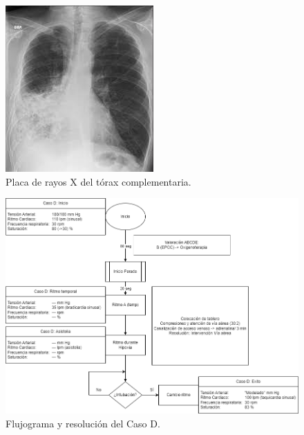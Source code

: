 \begin{figure}[hptb]
    \centering
	\includegraphics[width=0.25\linewidth]{./imagenes/UCIDoc-SVICasoDRXTorax.png}
	\caption{\label{fig:Brusilov:SVI:CasoDRXTorax}Placa de rayos X del tórax complementaria.}
\end{figure}

\begin{figure}[hptb]
    \centering
	\includegraphics[width=0.8\linewidth]{./imagenes/ACV-AdSC-CasosUCI_CasoD.png}
	\caption{\label{fig:Brusilov:SVI:CasoD}Flujograma y resolución del Caso D.}
\end{figure}




